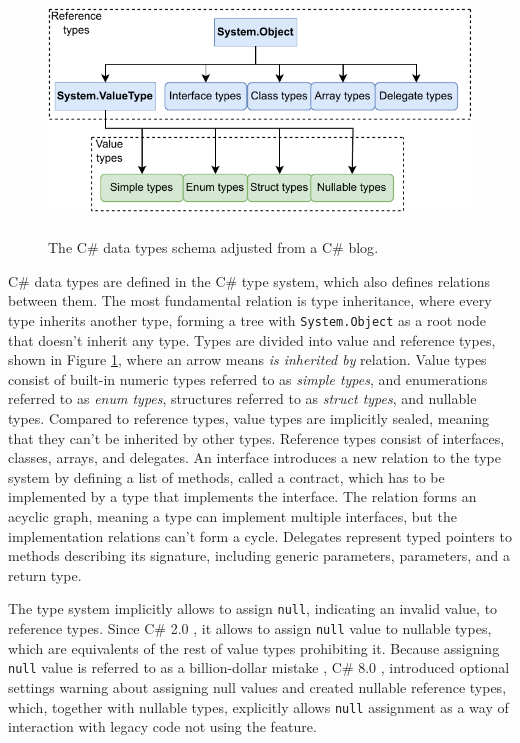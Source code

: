 \begin{figure}[b]
\centering
\includegraphics[width=140mm, height=65mm]{./img/CSTypeSystem.pdf}
\caption{The C\# data types schema adjusted from a C\# blog\cite{online:cSharpTypeSystem}.}
\label{img04:typeSys}
\end{figure}
C\# data types are defined in the C\# type system, which also defines relations between them. 
The most fundamental relation is type inheritance, where every type inherits another type, forming a tree with \texttt{System.Object} as a root node that doesn’t inherit any type.
Types are divided into value and reference types, shown in Figure \ref{img04:typeSys}, where an arrow means \textit{is inherited by} relation. 
Value types consist of built-in numeric types referred to as \textit{simple types}, and enumerations referred to as \textit{enum types}, structures referred to as \textit{struct types}, and nullable types. 
Compared to reference types, value types are implicitly sealed, meaning that they can’t be inherited by other types. 
Reference types consist of interfaces, classes, arrays, and delegates. 
An interface introduces a new relation to the type system by defining a list of methods, called a contract, which has to be implemented by a type that implements the interface.
The relation forms an acyclic graph, meaning a type can implement multiple interfaces, but the implementation relations can’t form a cycle. 
Delegates represent typed pointers to methods describing its signature, including generic parameters, parameters, and a return type.
\par
The type system implicitly allows to assign \texttt{null}, indicating an invalid value, to reference types. Since C\# 2.0 \cite{online:csHist}, it allows to assign \texttt{null} value to nullable types, which are equivalents of the rest of value types prohibiting it. Because assigning \texttt{null} value is referred to as a billion-dollar mistake \cite{online:billionDolarMistake}, C\# 8.0 \cite{online:csHist}, introduced optional settings warning about assigning null values and created nullable reference types, which, together with nullable types, explicitly allows \texttt{null} assignment as a way of interaction with legacy code not using the feature.
